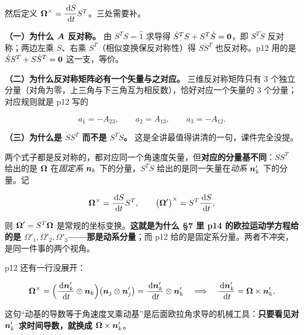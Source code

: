 \documentclass[11pt]{ctexart}
\begin{document}
然后定义 $\boldsymbol{\Omega}^{\times}=\dfrac{\,\mathrm{d} S}{\,\mathrm{d} t}S^{T}$。三处需要补。

\textbf{（一）为什么 $\boldsymbol{A}$ 反对称。} 由 $S^{T}S=\hat{1}$ 求导得 $\dot S^{T}S+S^{T}\dot S=\boldsymbol{0}$，即 $S^{T}\dot S$ 反对称；两边左乘 $S$、右乘 $S^{T}$（相似变换保反对称性）得 $\dot S S^{T}$ 也反对称。p12 用的是 $\dot S S^{T}+S\dot S^{T}=\boldsymbol{0}$ 这一支，等价。

\textbf{（二）为什么反对称矩阵必有一个矢量与之对应。} 三维反对称矩阵只有 3 个独立分量（对角为零，上三角与下三角互为相反数），恰好对应一个矢量的 3 个分量；对应规则就是 p12 写的

\[
a_1=-A_{23},\qquad a_2=A_{13},\qquad a_3=-A_{12}.
\]


\textbf{（三）为什么是 $\dot S S^{T}$ 而不是 $S^{T}\dot S$。} 这是全讲最值得讲清的一句，课件完全没提。


两个式子都是反对称的，都对应同一个角速度矢量，但\textbf{对应的分量基不同}：$\dot S S^{T}$ 给出的是 $\boldsymbol{\Omega}$ 在\emph{固定系} $\boldsymbol{n}_k$ 下的分量，$S^{T}\dot S$ 给出的是同一矢量在\emph{动系} $\boldsymbol{n}'_k$ 下的分量。记

\[
\boldsymbol{\Omega}^{\times}=\frac{\,\mathrm{d} S}{\,\mathrm{d} t}S^{T},
\qquad
\bigl(\boldsymbol{\Omega}'\bigr)^{\times}=S^{T}\frac{\,\mathrm{d} S}{\,\mathrm{d} t},
\]

则 $\boldsymbol{\Omega}'=S^{T}\boldsymbol{\Omega}$ 是常规的坐标变换。\textbf{这就是为什么 §7 里 p14 的欧拉运动学方程给的是 $\Omega'_1,\Omega'_2,\Omega'_3$——那是动系分量}；而 p12 给的是固定系分量。两者不冲突，是同一件事的两个视角。

p12 还有一行没展开：

\[
\boldsymbol{\Omega}^{\times}
=\Bigl(\frac{\,\mathrm{d}\boldsymbol{n}'_k}{\,\mathrm{d} t}\otimes\boldsymbol{n}_k\Bigr)
\bigl(\boldsymbol{n}_j\otimes\boldsymbol{n}'_j\bigr)
=\frac{\,\mathrm{d}\boldsymbol{n}'_k}{\,\mathrm{d} t}\otimes\boldsymbol{n}'_k
\quad\Longrightarrow\quad
\frac{\,\mathrm{d}\boldsymbol{n}'_k}{\,\mathrm{d} t}=\boldsymbol{\Omega}\times\boldsymbol{n}'_k .
\]


这句“动基的导数等于角速度叉乘动基”是后面欧拉角求导的机械工具：\textbf{只要看见对 $\boldsymbol{n}'_k$ 求时间导数，就换成 $\boldsymbol{\Omega}\times\boldsymbol{n}'_k$}。
\end{document}
